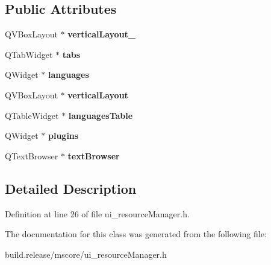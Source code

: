 \subsection*{Public Attributes}
\begin{DoxyCompactItemize}
\item 
\mbox{\label{class_ui___resource_a73a779ef0f7133439200d8c0a5bff34a}} 
Q\+V\+Box\+Layout $\ast$ {\bfseries vertical\+Layout\+\_}
\item 
\mbox{\label{class_ui___resource_a5874900cfa179520142231c6978d6f6a}} 
Q\+Tab\+Widget $\ast$ {\bfseries tabs}
\item 
\mbox{\label{class_ui___resource_a3e5985f40c6f30d65d288867d0d0997a}} 
Q\+Widget $\ast$ {\bfseries languages}
\item 
\mbox{\label{class_ui___resource_a7295ff19cf9941e86cd509e50236b9c7}} 
Q\+V\+Box\+Layout $\ast$ {\bfseries vertical\+Layout}
\item 
\mbox{\label{class_ui___resource_a336345d74c3f85ec90bee69fedca20fe}} 
Q\+Table\+Widget $\ast$ {\bfseries languages\+Table}
\item 
\mbox{\label{class_ui___resource_a16e16a9908196ffc437618aa380e99bf}} 
Q\+Widget $\ast$ {\bfseries plugins}
\item 
\mbox{\label{class_ui___resource_abef3db1ab4b76f72f4284ba3d43b2ccb}} 
Q\+Text\+Browser $\ast$ {\bfseries text\+Browser}
\end{DoxyCompactItemize}


\subsection{Detailed Description}


Definition at line 26 of file ui\+\_\+resource\+Manager.\+h.



The documentation for this class was generated from the following file\+:\begin{DoxyCompactItemize}
\item 
build.\+release/mscore/ui\+\_\+resource\+Manager.\+h\end{DoxyCompactItemize}
